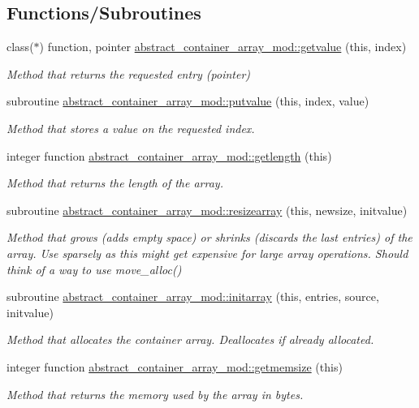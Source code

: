 \subsection*{Functions/\+Subroutines}
\begin{DoxyCompactItemize}
\item 
class($\ast$) function, pointer \mbox{\hyperlink{namespaceabstract__container__array__mod_a2b3e0aec504d76c73bf7f18158924af4}{abstract\+\_\+container\+\_\+array\+\_\+mod\+::getvalue}} (this, index)
\begin{DoxyCompactList}\small\item\em Method that returns the requested entry (pointer) \end{DoxyCompactList}\item 
subroutine \mbox{\hyperlink{namespaceabstract__container__array__mod_aae1f6309c51e282a528ce78f128443e0}{abstract\+\_\+container\+\_\+array\+\_\+mod\+::putvalue}} (this, index, value)
\begin{DoxyCompactList}\small\item\em Method that stores a value on the requested index. \end{DoxyCompactList}\item 
integer function \mbox{\hyperlink{namespaceabstract__container__array__mod_a22d71ca3f03bf0bb5d3737338e5e349a}{abstract\+\_\+container\+\_\+array\+\_\+mod\+::getlength}} (this)
\begin{DoxyCompactList}\small\item\em Method that returns the length of the array. \end{DoxyCompactList}\item 
subroutine \mbox{\hyperlink{namespaceabstract__container__array__mod_adb5b2e1692fa90a0239e9a0bcdc7967d}{abstract\+\_\+container\+\_\+array\+\_\+mod\+::resizearray}} (this, newsize, initvalue)
\begin{DoxyCompactList}\small\item\em Method that grows (adds empty space) or shrinks (discards the last entries) of the array. Use sparsely as this might get expensive for large array operations. Should think of a way to use move\+\_\+alloc() \end{DoxyCompactList}\item 
subroutine \mbox{\hyperlink{namespaceabstract__container__array__mod_a793ed0fff6fc6c5823f1e7f119f44959}{abstract\+\_\+container\+\_\+array\+\_\+mod\+::initarray}} (this, entries, source, initvalue)
\begin{DoxyCompactList}\small\item\em Method that allocates the container array. Deallocates if already allocated. \end{DoxyCompactList}\item 
integer function \mbox{\hyperlink{namespaceabstract__container__array__mod_a6733f8c7202ec84585ac4f52b6798f02}{abstract\+\_\+container\+\_\+array\+\_\+mod\+::getmemsize}} (this)
\begin{DoxyCompactList}\small\item\em Method that returns the memory used by the array in bytes. \end{DoxyCompactList}\end{DoxyCompactItemize}
